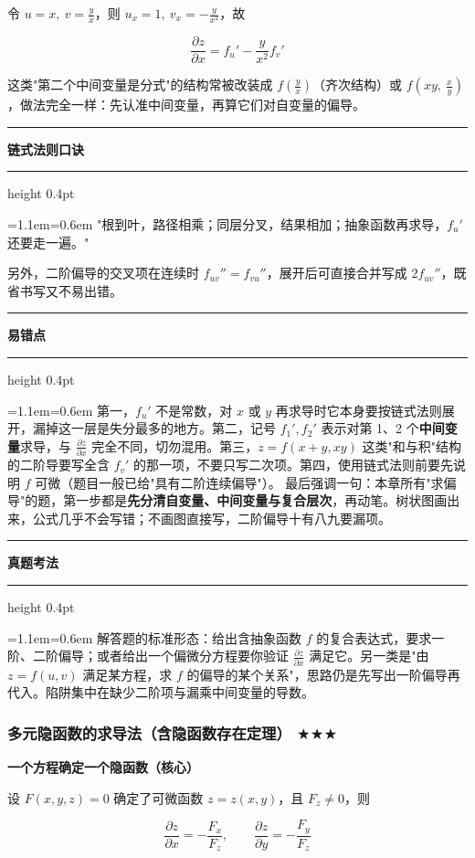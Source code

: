\documentclass[11pt,openany,UTF8]{ctexbook}
\newcommand{\callouthead}[2]{%
  \par\addvspace{7pt}\noindent
  {\color{#1}\rule[-0.15em]{3pt}{1.05em}}\hspace{0.5em}%
  {\bfseries\color{#1}#2}\par\nobreak\vspace{-0.35em}%
  {\color{rulesep}\hrule height 0.4pt}\nobreak\vspace{0.45em}%
  \begingroup\small\setlength{\parindent}{0pt}%
  \leftskip=1.1em\rightskip=0.6em\noindent\ignorespaces}
\newcommand{\calloutend}{\par\endgroup\addvspace{7pt}}
\newenvironment{callkey}[1]{\callouthead{keybar}{#1}}{\calloutend}
\newenvironment{callwarn}[1]{\callouthead{warnbar}{#1}}{\calloutend}
\newenvironment{callexam}[1]{\callouthead{exambar}{#1}}{\calloutend}
\begin{document}
令 $u=x,\ v=\frac yx$，则 $u_x=1,\ v_x=-\frac{y}{x^{2}}$，故

\[\frac{\partial z}{\partial x}=f_u'-\frac{y}{x^{2}}f_v'\]

这类"第二个中间变量是分式"的结构常被改装成 $f\left(\frac yx\right)$（齐次结构）或 $f\left(xy,\ \frac xy\right)$，做法完全一样：先认准中间变量，再算它们对自变量的偏导。

\begin{callkey}{链式法则口诀}
"根到叶，路径相乘；同层分叉，结果相加；抽象函数再求导，$f_u'$ 还要走一遍。"

\end{callkey}

另外，二阶偏导的交叉项在连续时 $f_{uv}''=f_{vu}''$，展开后可直接合并写成 $2f_{uv}''$，既省书写又不易出错。

\begin{callwarn}{易错点}
第一，$f_u'$ 不是常数，对 $x$ 或 $y$ 再求导时它本身要按链式法则展开，漏掉这一层是失分最多的地方。第二，记号 $f_1',f_2'$ 表示对第 1、2 个\textbf{中间变量}求导，与 $\frac{\partial z}{\partial x}$ 完全不同，切勿混用。第三，$z=f(x+y,xy)$ 这类"和与积"结构的二阶导要写全含 $f_v'$ 的那一项，不要只写二次项。第四，使用链式法则前要先说明 $f$ 可微（题目一般已给"具有二阶连续偏导"）。 最后强调一句：本章所有"求偏导"的题，第一步都是\textbf{先分清自变量、中间变量与复合层次}，再动笔。树状图画出来，公式几乎不会写错；不画图直接写，二阶偏导十有八九要漏项。

\end{callwarn}

\begin{callexam}{真题考法}
解答题的标准形态：给出含抽象函数 $f$ 的复合表达式，要求一阶、二阶偏导；或者给出一个偏微分方程要你验证 $\frac{\partial z}{\partial x}$ 满足它。另一类是"由 $z=f(u,v)$ 满足某方程，求 $f$ 的偏导的某个关系"，思路仍是先写出一阶偏导再代入。陷阱集中在缺少二阶项与漏乘中间变量的导数。

\end{callexam}

\subsubsection{多元隐函数的求导法（含隐函数存在定理） $\bigstar$$\bigstar$$\bigstar$}

\textbf{一个方程确定一个隐函数（核心）}

设 $F(x,y,z)=0$ 确定了可微函数 $z=z(x,y)$，且 $F_z\ne 0$，则

\[\frac{\partial z}{\partial x}=-\frac{F_x}{F_z},\qquad \frac{\partial z}{\partial y}=-\frac{F_y}{F_z}\]
\end{document}
